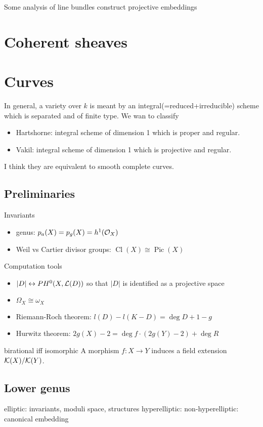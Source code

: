 \documentclass{../../large}
\newcommand{\Cl}{\operatorname{Cl}}
\newcommand{\Pic}{\operatorname{Pic}}
\begin{document}
Some analysis of line bundles construct projective embeddings


\chapter{Coherent sheaves}



\chapter{Curves}


In general, a variety over $k$ is meant by an integral(=reduced+irreducible) scheme which is separated and of finite type.
We wan to classify 
\begin{itemize}
\item Hartshorne: integral scheme of dimension 1 which is proper and regular.
\item Vakil: integral scheme of dimension 1 which is projective and regular.
\end{itemize}
I think they are equivalent to smooth complete curves.

\section{Preliminaries}
Invariants
\begin{itemize}
\item genus: $p_a(X)=p_g(X)=h^1(\mathcal{O}_X)$
\item Weil vs Cartier divisor groups: $\Cl(X)\cong\Pic(X)$
\end{itemize}

Computation tools
\begin{itemize}
\item $|D|\leftrightarrow PH^0(X,\mathcal{L}(D))$ so that $|D|$ is identified as a projective space
\item $\Omega_X\cong\omega_X$
\item Riemann-Roch theorem: $l(D)-l(K-D)=\deg D+1-g$
\item Hurwitz theorem: $2g(X)-2=\deg f\cdot(2g(Y)-2)+\deg R$
\end{itemize}


birational iff isomorphic
A morphism $f:X\to Y$ induces a field extension $\mathcal{K}(X)/\mathcal{K}(Y)$.

\section{Lower genus}
elliptic: invariants, moduli space, structures
hyperelliptic: 
non-hyperelliptic: canonical embedding
\end{document}
